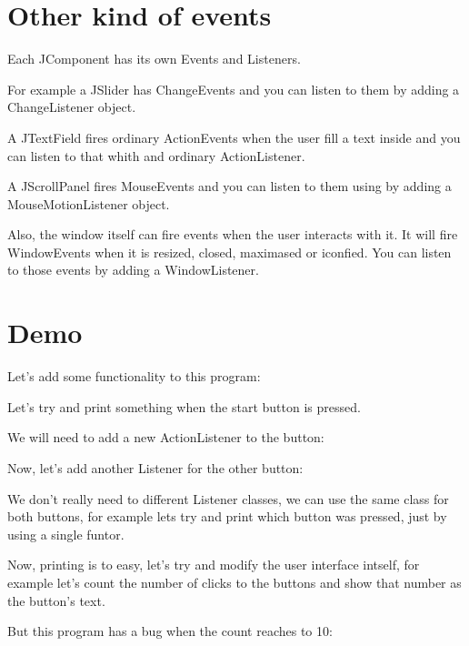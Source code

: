 \documentclass[a4paper, 9pt]{extarticle}
\begin{document}
\section{Other kind of events}

Each JComponent has its own Events and Listeners.

For example a JSlider has ChangeEvents and you can listen to them by adding a ChangeListener object.

A JTextField fires ordinary ActionEvents when the user fill a text inside and you can listen to that whith and ordinary ActionListener.

A JScrollPanel fires MouseEvents and you can listen to them using by adding a MouseMotionListener object.

Also, the window itself can fire events when the user interacts with it. It
will fire WindowEvents when it is resized, closed, maximased or iconfied. You
can listen to those events by adding a WindowListener.



\section{Demo}

Let's add some functionality to this program:


Let's try and print something when the start button is pressed.

We will need to add a new ActionListener to the button:


Now, let's add another Listener for the other button:


We don't really need to different Listener classes, we can use the same class
for both buttons, for example lets try and print which button was pressed, just
by using a single funtor.


Now, printing is to easy, let's try and modify the user interface intself, for
example let's count the number of clicks to the buttons and show that number as
the button's text.


But this program has a bug when the count reaches to 10:
\end{document}
